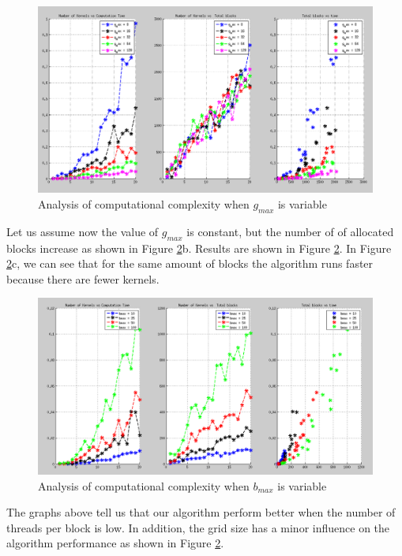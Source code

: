 \documentclass[
  12pt,
  a4paperpaper,
]{report}
\begin{document}
\begin{figure}
\centering
\includegraphics[width=1\textwidth,height=\textheight]{source/figures/gmax_variable.png}
\caption{Analysis of computational complexity when \(g_{max}\) is
variable \label{img:gmax_variable}}
\end{figure}

Let us assume now the value of \(g_{max}\) is constant, but the number
of of allocated blocks increase as shown in Figure
\ref{img:bmax_variable}b. Results are shown in Figure
\ref{img:bmax_variable}. In Figure \ref{img:bmax_variable}c, we can see
that for the same amount of blocks the algorithm runs faster because
there are fewer kernels.

\begin{figure}
\centering
\includegraphics[width=1\textwidth,height=\textheight]{source/figures/bmax_variable.png}
\caption{Analysis of computational complexity when \(b_{max}\) is
variable \label{img:bmax_variable}}
\end{figure}

The graphs above tell us that our algorithm perform better when the
number of threads per block is low. In addition, the grid size has a
minor influence on the algorithm performance as shown in Figure
\ref{img:bmax_variable}.
\end{document}
